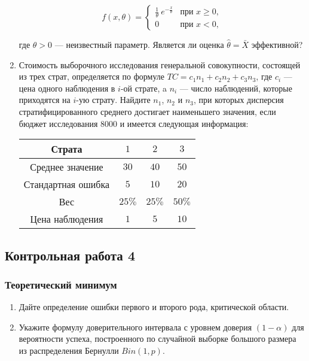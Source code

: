 \begin{enumerate}
\[
f(x,\theta) =
\begin{cases}
\frac{1}{\theta} \ e^{-\frac{x}{\theta}} & \text{при } x \geq 0, \\
0 & \text{при } x < 0, \end{cases}
\]

где $\theta > 0$ — неизвестный параметр. Является ли оценка  $\hat{\theta} = \bar{X}$ эффективной?

\item Стоимость выборочного исследования генеральной совокупности,
состоящей из трех страт, определяется по формуле
$TC = c_1n_1 + c_2n_2 + c_3n_3$, где $c_i$ — цена одного наблюдения в $i$-ой страте,
a $n_i$ — число наблюдений, которые приходятся на $i$-ую страту.
Найдите $n_1$, $n_2$ и $n_3$, при которых дисперсия стратифицированного среднего
достигает наименьшего значения,
если бюджет исследования 8000 и имеется следующая информация:

\begin{center}
\begin{tabular}{cccc}
\toprule
 Страта & $1$ & $2$ & $3$  \\
 \midrule
 Среднее значение & $30$ & $40$ & $50$ \\
 Стандартная ошибка  & $5$ & $10$ & $20$ \\
 Вес & $25\%$ & $25\%$ & $50\%$ \\
 Цена наблюдения & $1$ & $5$ & $10$ \\
 \bottomrule
\end{tabular}
\end{center}
\end{enumerate}


\newpage
\subsection{Контрольная работа 4}

\subsubsection*{Теоретический минимум}

\begin{enumerate}
  \item Дайте определение ошибки первого и второго рода, критической области.
  \item Укажите формулу доверительного интервала с уровнем доверия $(1-\alpha)$ для вероятности успеха,
	построенного по случайной выборке большого размера из распределения Бернулли $Bin(1, p)$.
\end{enumerate}

